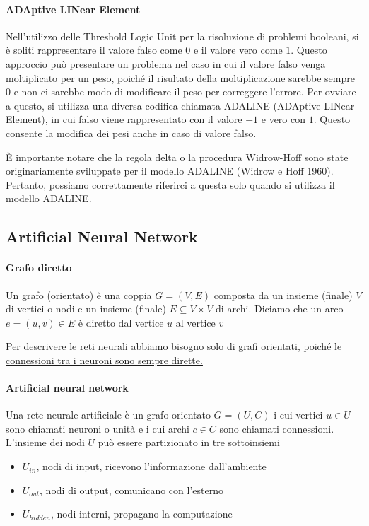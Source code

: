 \paragraph{ADAptive LINear Element}
Nell'utilizzo delle Threshold Logic Unit per la risoluzione di problemi booleani, si è soliti rappresentare il valore falso come $0$ e il valore vero come $1$. Questo approccio può presentare un problema nel caso in cui il valore falso venga moltiplicato per un peso, poiché il risultato della moltiplicazione sarebbe sempre $0$ e non ci sarebbe modo di modificare il peso per correggere l'errore. Per ovviare a questo, si utilizza una diversa codifica chiamata ADALINE (ADAptive LINear Element), in cui falso viene rappresentato con il valore $-1$ e vero con $1$. Questo consente la modifica dei pesi anche in caso di valore falso.

È importante notare che la regola delta o la procedura Widrow-Hoff sono state originariamente sviluppate per il modello ADALINE (Widrow e Hoff 1960). Pertanto, possiamo correttamente riferirci a questa solo quando si utilizza il modello ADALINE.


\subsection{Artificial Neural Network}
\paragraph{Grafo diretto}
Un grafo (orientato) è una coppia $G = (V, E)$ composta da un insieme (finale) $V$ di vertici o nodi e un insieme (finale) $E \subseteq V \times V$ di archi. Diciamo che un arco $e = (u, v) \in E$ è diretto dal vertice $u$ al vertice $v$

\uline{Per descrivere le reti neurali abbiamo bisogno solo di grafi orientati, poiché le connessioni tra i neuroni sono sempre dirette.}

\paragraph{Artificial neural network}
Una rete neurale artificiale è un grafo orientato $G = (U, C)$ i cui vertici $u \in U$ sono chiamati neuroni o unità e i cui archi $c \in C$ sono chiamati connessioni. L’insieme dei nodi $U$ può essere partizionato in tre sottoinsiemi
\begin{itemize}
    \item \textit{$U_{in}$}, nodi di input, ricevono l’informazione dall’ambiente
    \item \textit{$U_{out}$}, nodi di output, comunicano con l’esterno
    \item \textit{$U_{hidden}$}, nodi interni, propagano la computazione
\end{itemize}

